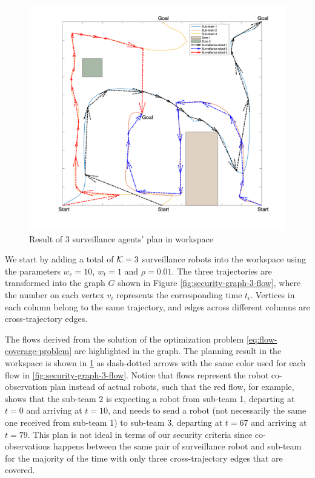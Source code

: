 \documentclass[journal]{IEEEtran}  %
\begin{document}
\begin{figure}[htbp]
\begin{center}
\includegraphics[width=0.6\linewidth]{3_flow_result}
\caption{Result of 3 surveillance agents' plan in workspace}
\label{fig:workspace-3-flow}
\end{center}
\end{figure}

We start by adding a total of $\mathcal{K}=3$ surveillance robots into the workspace using the parameters $w_{c}=10$, $w_{t}=1$ and $\rho = 0.01$. The three trajectories are transformed into the graph $G$ shown in Figure \ref{fig:security-graph-3-flow}, where the number on each vertex $v_{i}$ represents the corresponding time $t_{i}$. Vertices in each column belong to the same trajectory, and edges across different columns are cross-trajectory edges. 

The flows derived from the solution of the optimization problem \eqref{eq:flow-coverage-problem} are highlighted in the graph. The planning result in the workspace is shown in \ref{fig:workspace-3-flow} as dash-dotted arrows with the same color used for each flow in \ref{fig:security-graph-3-flow}. Notice that flows represent the robot co-observation plan instead of actual robots, such that the red flow, for example, shows that the sub-team 2 is expecting a robot from sub-team 1, departing at $t=0$ and arriving at $t=10$, and needs to send a robot (not necessarily the same one received from sub-team 1) to sub-team 3, departing at $t=67$ and arriving at $t=79$. This plan is not ideal in terms of our security criteria since co-observations happens between the same pair of surveillance robot and sub-team for the majority of the time with only three cross-trajectory edges that are covered.
\end{document}
